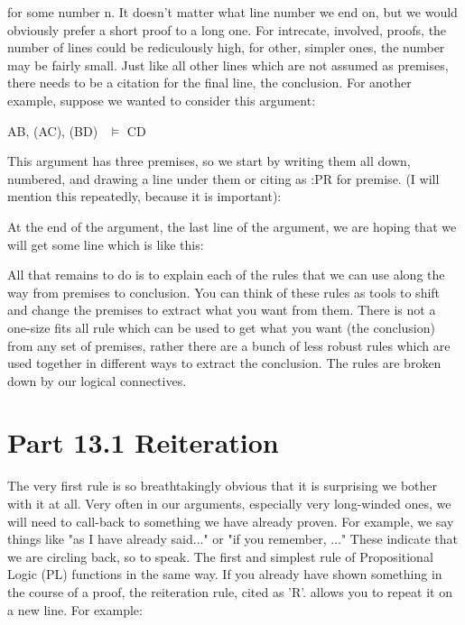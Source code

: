 for some number n. It doesn’t matter what line number we end on, but we would obviously prefer a short proof to a long one. For intrecate, involved, proofs, the number of lines could be rediculously high, for other, simpler ones, the number may be fairly small. Just like all other lines which are not assumed as premises, there needs to be a citation for the final line, the conclusion. For another example, suppose we wanted to consider this argument:
\begin{center}
A\eor B, \enot (A\eand C), \enot (B\eand \enot D)  $\vDash$ \enot C\eor D
\end{center}
This argument has three premises, so we start by writing them all down, numbered, and drawing a line under them or citing as :PR for premise. (I will mention this repeatedly, because it is important):

\begin{fitchproof}
\end{fitchproof}

At the end of the argument, the last line of the argument, we are hoping that we will get some line which is like this:

\begin{fitchproof}
\end{fitchproof}

All that remains to do is to explain each of the rules that we can use along the way from premises to conclusion. You can think of these rules as tools to shift and change the premises to extract what you want from them. There is not a one-size fits all rule which can be used to get what you want (the conclusion) from any set of premises, rather there are a bunch of less robust rules which are used together in different ways to extract the conclusion. The rules are broken down by our logical connectives.
\section{Part 13.1 Reiteration}
The very first rule is so breathtakingly obvious that it is surprising we bother with it at all. Very often in our arguments, especially very long-winded ones, we will need to call-back to something we have already proven. For example, we say things like "as I have already said..." or "if you remember, ..." These indicate that we are circling back, so to speak. The first and simplest rule of Propositional Logic (PL) functions in the same way. If you already have shown something in the course of a proof, the reiteration rule, cited as 'R'. allows you to repeat it on a new line. For example:

